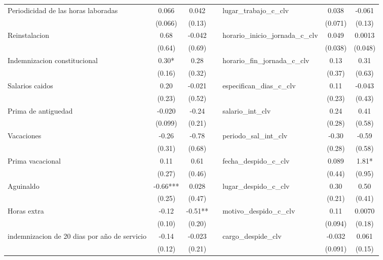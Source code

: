 \begin{tabular}{lccrrcc}
Periodicidad de las horas laboradas & 0.066 & 0.042 &       & \multicolumn{1}{l}{lugar_trabajo_c_clv} & 0.038 & -0.061 \\
      & (0.066) & (0.13) &       & \multicolumn{1}{l}{} & (0.071) & (0.13) \\
Reinstalacion & 0.68  & -0.042 &       & \multicolumn{1}{l}{horario_inicio_jornada_c_clv} & 0.049 & 0.0013 \\
      & (0.64) & (0.69) &       & \multicolumn{1}{l}{} & (0.038) & (0.048) \\
Indemnizacion constitucional & 0.30* & 0.28  &       & \multicolumn{1}{l}{horario_fin_jornada_c_clv} & 0.13  & 0.31 \\
      & (0.16) & (0.32) &       & \multicolumn{1}{l}{} & (0.37) & (0.63) \\
Salarios caidos & 0.20  & -0.021 &       & \multicolumn{1}{l}{especifican_dias_c_clv} & 0.11  & -0.043 \\
      & (0.23) & (0.52) &       & \multicolumn{1}{l}{} & (0.23) & (0.43) \\
Prima de antiguedad & -0.020 & -0.24 &       & \multicolumn{1}{l}{salario_int_clv} & 0.24  & 0.41 \\
      & (0.099) & (0.21) &       & \multicolumn{1}{l}{} & (0.28) & (0.58) \\
Vacaciones & -0.26 & -0.78 &       & \multicolumn{1}{l}{periodo_sal_int_clv} & -0.30 & -0.59 \\
      & (0.31) & (0.68) &       & \multicolumn{1}{l}{} & (0.28) & (0.58) \\
Prima vacacional & 0.11  & 0.61  &       & \multicolumn{1}{l}{fecha_despido_c_clv} & 0.089 & 1.81* \\
      & (0.27) & (0.46) &       & \multicolumn{1}{l}{} & (0.44) & (0.95) \\
Aguinaldo & -0.66*** & 0.028 &       & \multicolumn{1}{l}{lugar_despido_c_clv} & 0.30  & 0.50 \\
      & (0.25) & (0.47) &       & \multicolumn{1}{l}{} & (0.21) & (0.41) \\
Horas extra & -0.12 & -0.51** &       & \multicolumn{1}{l}{motivo_despido_c_clv} & 0.11  & 0.0070 \\
      & (0.10) & (0.20) &       & \multicolumn{1}{l}{} & (0.094) & (0.18) \\
indemnizacion de 20 dias por año de servicio & -0.14 & -0.023 &       & \multicolumn{1}{l}{cargo_despide_clv} & -0.032 & 0.061 \\
      & (0.12) & (0.21) &       & \multicolumn{1}{l}{} & (0.091) & (0.15) \\

\end{tabular}
